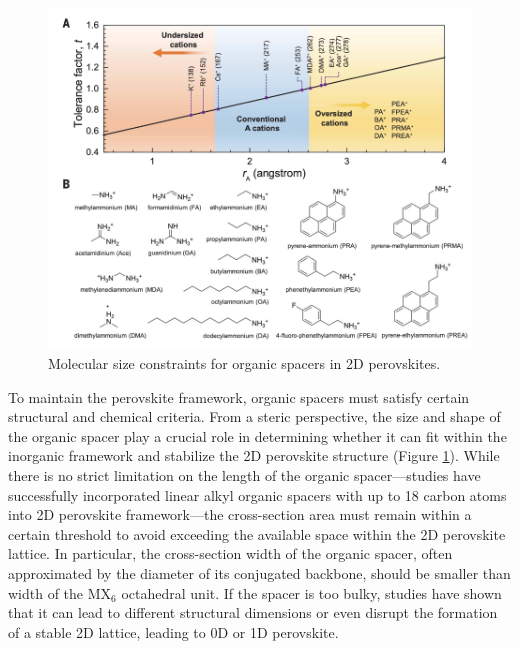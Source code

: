\begin{figure}[ht]
    \centering
    \includegraphics[width=\textwidth]{figures/literature-review/figure2-13.png}
    \caption{Molecular size constraints for organic spacers in 2D perovskites\cite{RN42}.}
    \label{fig:figure2.13}
\end{figure}

To maintain the perovskite framework, organic spacers must satisfy certain structural and chemical criteria. From a steric perspective, the size and shape of the organic spacer play a crucial role in determining whether it can fit within the inorganic framework and stabilize the 2D perovskite structure (Figure \ref{fig:figure2.13}). While there is no strict limitation on the length of the organic spacer—studies have successfully incorporated linear alkyl organic spacers with up to 18 carbon atoms into 2D perovskite framework\cite{RN637,RN638,RN639}—the cross-section area must remain within a certain threshold to avoid exceeding the available space within the 2D perovskite lattice\cite{RN519}. In particular, the cross-section width of the organic spacer, often approximated by the diameter of its conjugated backbone, should be smaller than width of the MX$_6$ octahedral unit\cite{RN20}. If the spacer is too bulky, studies have shown that it can lead to different structural dimensions or even disrupt the formation of a stable 2D lattice, leading to 0D or 1D perovskite\cite{RN640,RN641}.


